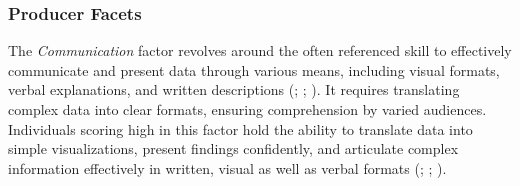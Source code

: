 \documentclass[
  12pt,
  a4paper,
  twoside]{article}
\begin{document}
\subsubsection{Producer Facets}\label{producer-facets}

The \emph{Communication} factor revolves around the often referenced skill to effectively communicate and present data through various means, including visual formats, verbal explanations, and written descriptions (; ; ).
It requires translating complex data into clear formats, ensuring comprehension by varied audiences. Individuals scoring high in this factor hold the ability to translate data into simple visualizations, present findings confidently, and articulate complex information effectively in written, visual as well as verbal formats (; ; ).
\end{document}
